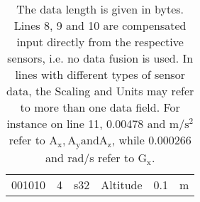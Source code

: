 \begin{table}[!b]
{\begin{minipage}{18cm}
\begin{tabular}{@{\makebox[3em][r]{\rownumber\space}}|llllll}
				001010               & 4                    & s32                 & Altitude                    & 0.1                & m                                                
			\end{tabular}
			\caption[Object dictionary.]{The data length is given in bytes. Lines 8, 9 and 10 are compensated input directly from the respective sensors, i.e. no data fusion is used. 
				In lines with different types of sensor data, the Scaling and Units may refer to more than one data field.
				For instance on line 11, 0.00478 and $\si{\meter \per \second \squared}$ refer to $\mathrm{A_x, A_y and A_z}$, while 0.000266 and rad/s refer to $\mathrm{G_x}$.}
			\label{tab:OD}
		\end{minipage}
	}
	\end{table}